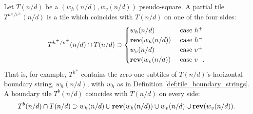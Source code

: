 \documentclass[12pt]{amsart}
\begin{document}
\begin{definition} \label{def:partial_tile}
	Let $T(n/d)$ be a $(w_{h}(n/d), w_v(n/d))$ pseudo-square. A partial tile
	$T^{h^{\pm}/v^{\pm}}(n/d)$ is a tile which coincides with $T(n/d)$ 
	on one of the four sides: 
	\begin{equation}
	T^{h^{\pm}/v^{\pm}}(n/d) \cap T(n/d)
	\supset
	\begin{cases}
	w_h(n/d) &\mbox{ case $h^+$} \\
	\mathop{\bf rev}(w_h(n/d)) &\mbox{ case $h^-$} \\
	w_v(n/d) &\mbox{ case $v^+$ }  \\
	\mathop{\bf rev}(w_v(n/d)) &\mbox{ case $v^-$}.
	\end{cases}
	\end{equation}	
	That is, for example, $T^{h^+}$ contains the zero-one subtiles of $T(n/d)$'s horizontal boundary string, $w_h(n/d)$, with $w_h$ as in Definition \ref{def:tile_boundary_strings}. 
	A boundary tile $T^b(n/d)$ coincides with $T(n/d)$ on every side: 
	\begin{equation}
	T^b(n/d) \cap T(n/d)
	\supset  w_h(n/d) \cup \mathop{\bf rev}(w_h(n/d)) \cup w_v(n/d) \cup \mathop{\bf rev}(w_v(n/d)).
	\end{equation}	
	

\end{definition}
\end{document}
